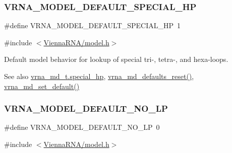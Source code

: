 \subsubsection{\texorpdfstring{V\+R\+N\+A\+\_\+\+M\+O\+D\+E\+L\+\_\+\+D\+E\+F\+A\+U\+L\+T\+\_\+\+S\+P\+E\+C\+I\+A\+L\+\_\+\+HP}{VRNA\_MODEL\_DEFAULT\_SPECIAL\_HP}}
{\footnotesize\ttfamily \#define V\+R\+N\+A\+\_\+\+M\+O\+D\+E\+L\+\_\+\+D\+E\+F\+A\+U\+L\+T\+\_\+\+S\+P\+E\+C\+I\+A\+L\+\_\+\+HP~1}



{\ttfamily \#include $<$\mbox{\hyperlink{model_8h}{Vienna\+R\+N\+A/model.\+h}}$>$}



Default model behavior for lookup of special tri-\/, tetra-\/, and hexa-\/loops. 

\begin{DoxySeeAlso}{See also}
\mbox{\hyperlink{group__model__details_add64a96d23e77ef1d0ddf8dfc5228143}{vrna\+\_\+md\+\_\+t.\+special\+\_\+hp}}, \mbox{\hyperlink{group__model__details_ga70834424cf804d149937de89f80ceb45}{vrna\+\_\+md\+\_\+defaults\+\_\+reset()}}, \mbox{\hyperlink{group__model__details_ga8ac6ff84936282436f822644bf841f66}{vrna\+\_\+md\+\_\+set\+\_\+default()}} 
\end{DoxySeeAlso}
\mbox{\label{group__model__details_gab72462726dd60ed0d43339bbf7ee08ad}} 
\subsubsection{\texorpdfstring{V\+R\+N\+A\+\_\+\+M\+O\+D\+E\+L\+\_\+\+D\+E\+F\+A\+U\+L\+T\+\_\+\+N\+O\+\_\+\+LP}{VRNA\_MODEL\_DEFAULT\_NO\_LP}}
{\footnotesize\ttfamily \#define V\+R\+N\+A\+\_\+\+M\+O\+D\+E\+L\+\_\+\+D\+E\+F\+A\+U\+L\+T\+\_\+\+N\+O\+\_\+\+LP~0}



{\ttfamily \#include $<$\mbox{\hyperlink{model_8h}{Vienna\+R\+N\+A/model.\+h}}$>$}



